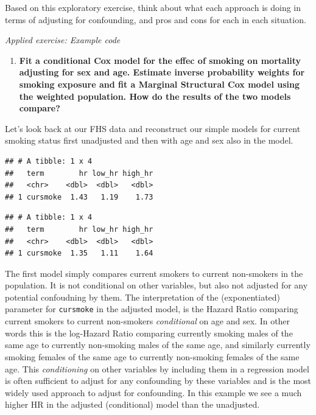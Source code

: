 \documentclass[
]{book}
\providecommand{\tightlist}{%
  \setlength{\itemsep}{0pt}\setlength{\parskip}{0pt}}
\begin{document}
Based on this exploratory exercise, think about what each approach is doing in terms of adjusting for confounding, and pros and cons for each in each situation.

\emph{Applied exercise: Example code}

\begin{enumerate}
\def\labelenumi{\arabic{enumi}.}
\tightlist
\item
  \textbf{Fit a conditional Cox model for the effec of smoking on mortality adjusting for sex and age. Estimate inverse probability weights for smoking exposure and fit a Marginal Structural Cox model using the weighted population. How do the results of the two models compare?}
\end{enumerate}

Let's look back at our FHS data and reconstruct our simple models for current smoking status first unadjusted and then with age and sex also in the model.

\begin{verbatim}
## # A tibble: 1 x 4
##   term        hr low_hr high_hr
##   <chr>    <dbl>  <dbl>   <dbl>
## 1 cursmoke  1.43   1.19    1.73
\end{verbatim}

\begin{verbatim}
## # A tibble: 1 x 4
##   term        hr low_hr high_hr
##   <chr>    <dbl>  <dbl>   <dbl>
## 1 cursmoke  1.35   1.11    1.64
\end{verbatim}

The first model simply compares current smokers to current non-smokers in the population. It is not conditional on other variables, but also not adjusted for any potential confoudning by them. The interpretation of the (exponentiated) parameter for \texttt{cursmoke} in the adjusted model, is the Hazard Ratio comparing current smokers to current non-smokers \emph{conditional} on age and sex. In other words this is the log-Hazard Ratio comparing currently smoking males of the same age to currently non-smoking males of the same age, and similarly currently smoking females of the same age to currently non-smoking females of the same age. This \emph{conditioning} on other variables by including them in a regression model is often sufficient to adjust for any confounding by these variables and is the most widely used approach to adjust for confounding. In this example we see a much higher HR in the adjusted (conditional) model than the unadjusted.
\end{document}
